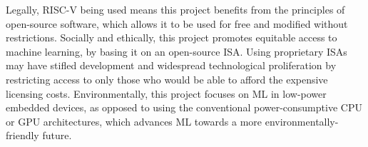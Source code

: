 \documentclass[a4paper,12pt]{report}
\begin{document}
Legally, RISC-V being used means this project benefits from the principles of open-source software, which allows it to be used for free and modified without restrictions. Socially and ethically, this project promotes equitable access to machine learning, by basing it on an open-source ISA. Using proprietary ISAs may have stifled development and widespread technological proliferation by restricting access to only those who would be able to afford the expensive licensing costs. Environmentally, this project focuses on ML in low-power embedded devices, as opposed to using the conventional power-consumptive CPU or GPU architectures, which advances ML towards a more environmentally-friendly future.



\nocite{*}



\end{document}
